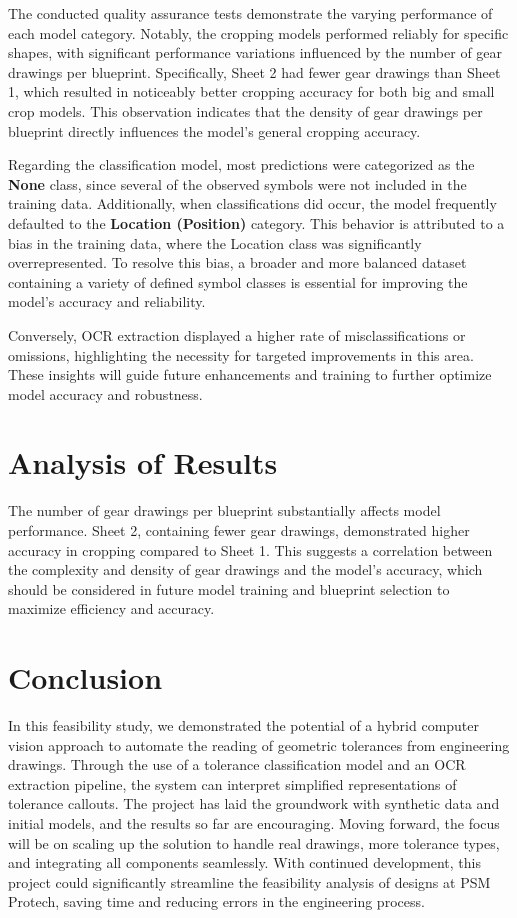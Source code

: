\documentclass[11pt,a4paper]{article}
\begin{document}
The conducted quality assurance tests demonstrate the varying performance of each model category. Notably, the cropping models performed reliably for specific shapes, with significant performance variations influenced by the number of gear drawings per blueprint. Specifically, Sheet 2 had fewer gear drawings than Sheet 1, which resulted in noticeably better cropping accuracy for both big and small crop models. This observation indicates that the density of gear drawings per blueprint directly influences the model's general cropping accuracy.

Regarding the classification model, most predictions were categorized as the \textbf{None} class, since several of the observed symbols were not included in the training data. Additionally, when classifications did occur, the model frequently defaulted to the \textbf{Location (Position)} category. This behavior is attributed to a bias in the training data, where the Location class was significantly overrepresented. To resolve this bias, a broader and more balanced dataset containing a variety of defined symbol classes is essential for improving the model’s accuracy and reliability.

Conversely, OCR extraction displayed a higher rate of misclassifications or omissions, highlighting the necessity for targeted improvements in this area. These insights will guide future enhancements and training to further optimize model accuracy and robustness.

\section*{Analysis of Results}

The number of gear drawings per blueprint substantially affects model performance. Sheet 2, containing fewer gear drawings, demonstrated higher accuracy in cropping compared to Sheet 1. This suggests a correlation between the complexity and density of gear drawings and the model’s accuracy, which should be considered in future model training and blueprint selection to maximize efficiency and accuracy.


\section{Conclusion}
In this feasibility study, we demonstrated the potential of a hybrid computer vision approach to automate the reading of geometric tolerances from engineering drawings. Through the use of a tolerance classification model and an OCR extraction pipeline, the system can interpret simplified representations of tolerance callouts. The project has laid the groundwork with synthetic data and initial models, and the results so far are encouraging. Moving forward, the focus will be on scaling up the solution to handle real drawings, more tolerance types, and integrating all components seamlessly. With continued development, this project could significantly streamline the feasibility analysis of designs at PSM Protech, saving time and reducing errors in the engineering process.
\end{document}
